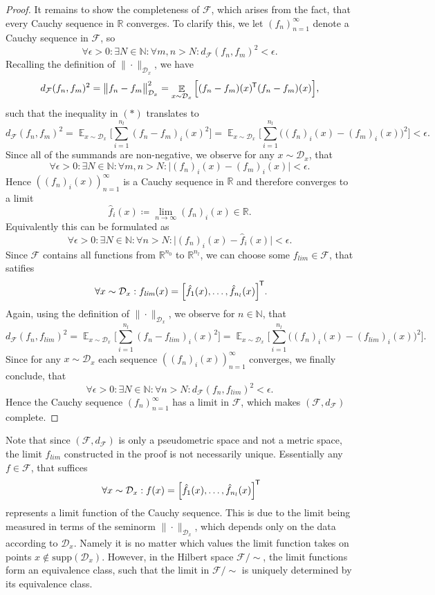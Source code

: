 \documentclass[11pt, a4paper]{article}
\newcommand{\N}{\mathbb{N}}
\newcommand{\R}{\mathbb{R}}
\newcommand{\D}{\mathcal{D}}
\newcommand{\F}{\mathcal{F}}
\newcommand*{\tr}{^{\mkern-1.5mu\mathsf{T}}}
\DeclareMathOperator*{\E}{\mathbb{E}}
\begin{document}
\begin{proof}
It remains to show the completeness of $\F$, which arises from the fact, that every Cauchy sequence in $\R$ converges. To clarify this, we let $(f_n)_{n=1}^\infty$ denote a Cauchy sequence in $\F$, so
\begin{equation} \tag{$\ast$} \forall \epsilon > 0 : \exists N \in \N : \forall m,n > N : d_{\F}(f_n, f_m)^2 < \epsilon. \end{equation}
Recalling the definition of $\| \cdot \|_{\D_x}$, we have
\[ d_{\F}(f_n ,f_m)^2 = \big \| f_n - f_m \big \|_{\D_x}^2 = \E_{x \sim \D_x} \Big [ ( f_n - f_m )(x) \tr ( f_n - f_m )(x) \Big ], \]
such that the inequality in $(\ast)$ translates to
\[ d_{\F}(f_n ,f_m)^2 = \E_{x \sim \D_x} \Big [ \sum_{i=1}^{n_l} (f_n - f_m)_i(x)^2 \Big ] = \E_{x \sim \D_x} \Big [ \sum_{i=1}^{n_l} \big ( (f_n)_i(x) - (f_m)_i(x) \big )^2 \Big ] < \epsilon. \]
Since all of the summands are non-negative, we observe for any $x \sim \D_x$, that 
\[ \forall \epsilon > 0 : \exists N \in \N : \forall m,n > N : \big | (f_n)_i(x) - (f_m)_i(x) \big | < \epsilon. \]
Hence $((f_n)_i(x))_{n=1}^\infty$ is a Cauchy sequence in $\R$ and therefore converges to a limit
\[ \hat{f}_i(x) \coloneq \lim_{n \to \infty} (f_n)_i(x) \in \R. \]
Equivalently this can be formulated as
\[ \forall \epsilon > 0 : \exists N \in \N : \forall n > N : \big | (f_n)_i(x) - \hat{f}_i(x) \big | < \epsilon. \]
Since $\F$ contains all functions from $\R^{n_0}$ to $\R^{n_l}$, we can choose some $f_\textit{lim} \in \F$, that satifies
\[ \forall x \sim \D_x : f_\textit{lim}(x) =  \Big [ \hat{f}_1(x), \dots, \hat{f}_{n_l}(x) \Big ] \tr. \]
Again, using the definition of $\| \cdot \|_{\D_x}$, we observe for $n \in \N$, that
\[ d_{\F}(f_n ,f_\textit{lim})^2 = \E_{x \sim \D_x} \Big [ \sum_{i=1}^{n_l} (f_n - f_\textit{lim})_i(x)^2 \Big ] = \E_{x \sim \D_x} \Big [ \sum_{i=1}^{n_l} \big ( (f_n)_i(x) - (f_\textit{lim})_i(x) \big )^2 \Big ]. \]
Since for any $x \sim \D_x$ each sequence $((f_n)_i(x))_{n=1}^\infty$ converges, we finally conclude, that
\[ \forall \epsilon > 0 : \exists N \in \N : \forall n > N : d_{\F}(f_n, f_\textit{lim})^2 < \epsilon. \]
Hence the Cauchy sequence $(f_n)_{n=1}^\infty$ has a limit in $\F$, which makes $(\F,d_{\F})$ complete.
\end{proof}

Note that since $(\F, d_{\F})$ is only a pseudometric space and not a metric space, the limit $f_\textit{lim}$ constructed in the proof is not necessarily unique. Essentially any $f \in \F$, that suffices 
\[ \forall x \sim \D_x : f(x) =  \Big [ \hat{f}_1(x), \dots, \hat{f}_{n_l}(x) \Big ] \tr \]
represents a limit function of the Cauchy sequence. This is due to the limit being measured in terms of the seminorm $\| \cdot \|_{\D_x}$, which depends only on the data according to $\D_x$. Namely it is no matter which values the limit function takes on points $x \notin \text{supp}(\D_x)$. However, in the Hilbert space $\F/{\sim}$, the limit functions form an equivalence class, such that the limit in $\F/{\sim}$ is uniquely determined by its equivalence class. \\
\end{document}

